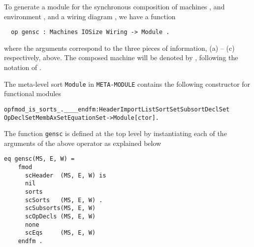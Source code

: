 \documentclass[copyright,creativecommons]{eptcs}
\begin{document}
To generate a module for the synchronous composition of machines , and environment , and a wiring diagram , we have a function

\begin{center}
\begin{small}
\begin{boxedminipage}{0.60\textwidth}
\begin{verbatim}
  op gensc : Machines IOSize Wiring -> Module .
\end{verbatim}
\end{boxedminipage}
\end{small}
\end{center}

\noindent 
where the arguments correspond to the three pieces of information, (a) -- (c)
respectively, above. The composed machine will be denoted by , following
the notation of \cite{meseguer_2010_01,meseguer_2009_01}.

The meta-level sort {\tt Module} in {\tt META-MODULE} contains the following
constructor for functional modules

\begin{center}
\begin{small}
\begin{boxedminipage}{0.90\textwidth}
\begin{alltt}
op fmod_is_sorts_.____endfm : Header ImportList SortSet SubsortDeclSet
  OpDeclSet MembAxSet EquationSet -> Module [ctor ].
\end{alltt}
\end{boxedminipage}
\end{small}
\end{center}

\noindent
The function {\tt gensc} is defined at the top level by instantiating each of
the arguments of the above operator as explained below

\begin{center}
\begin{small}
\begin{boxedminipage}{0.40\textwidth}
\begin{verbatim}
eq gensc(MS, E, W) =
    fmod
      scHeader  (MS, E, W) is 
      nil 
      sorts 
      scSorts   (MS, E, W) . 
      scSubsorts(MS, E, W) 
      scOpDecls (MS, E, W) 
      none 
      scEqs     (MS, E, W) 
    endfm .
\end{verbatim}
\end{boxedminipage}
\end{small}
\end{center}
\end{document}
